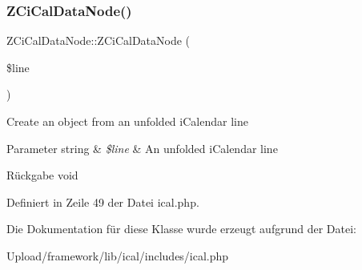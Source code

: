 \subsubsection{\texorpdfstring{Z\+Ci\+Cal\+Data\+Node()}{ZCiCalDataNode()}}
{\footnotesize\ttfamily Z\+Ci\+Cal\+Data\+Node\+::\+Z\+Ci\+Cal\+Data\+Node (\begin{DoxyParamCaption}\item[{}]{\$line }\end{DoxyParamCaption})}

Create an object from an unfolded i\+Calendar line


\begin{DoxyParams}[1]{Parameter}
string & {\em \$line} & An unfolded i\+Calendar line\\
\hline
\end{DoxyParams}
\begin{DoxyReturn}{Rückgabe}
void 
\end{DoxyReturn}


Definiert in Zeile 49 der Datei ical.\+php.



Die Dokumentation für diese Klasse wurde erzeugt aufgrund der Datei\+:\begin{DoxyCompactItemize}
\item 
Upload/framework/lib/ical/includes/ical.\+php\end{DoxyCompactItemize}
